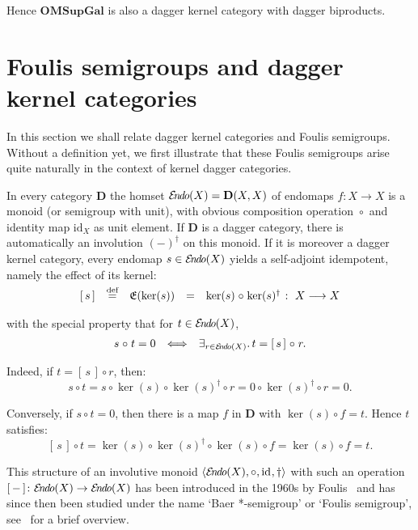\documentclass{article}
\newcommand{\after}{\mathrel{\circ}}
\newcommand{\Cat}[1]{\ensuremath{\mathbf{#1}}}
\newcommand{\idmap}[1][]{\ensuremath{\mathrm{id}_{#1}}}
\newcommand{\exin}[3]{\exists_{#1\in#2}.\,#3}
\newcommand{\effect}[1]{\mathfrak{E}(#1)}
\newcommand{\sai}[1]{[\,#1\,]}
\newcommand{\EndoHom}[1]{{\cal E}{\kern-.5ex}\textit{n}{\kern-.2ex}\textit{d}{\kern-.2ex}\textit{o}(#1)}
\begin{document}
\noindent Hence \Cat{OMSupGal} is also a dagger kernel category
with dagger biproducts.





\section{Foulis semigroups and dagger kernel categories}\label{FoulisDagKerSec}

In this section we shall relate dagger kernel categories and Foulis
semigroups. Without a definition yet, we first illustrate that these
Foulis semigroups arise quite naturally in the context of kernel
dagger categories.

In every category \Cat{D} the homset $\EndoHom{X} = \Cat{D}(X, X)$ of
endomaps $f\colon X\rightarrow X$ is a monoid (or semigroup with
unit), with obvious composition operation $\after$ and identity map
$\idmap[X]$ as unit element. If \Cat{D} is a dagger category, there is
automatically an involution $(-)^\dag$ on this monoid. If it is
moreover a dagger kernel category, every endomap $s\in\EndoHom{X}$
yields a self-adjoint idempotent, namely the effect of its kernel:
\begin{equation}
\label{DagKerSaiEqn}
\begin{array}{rcccl}
\sai{s}
& \smash{\stackrel{\textrm{def}}{=}} &
\effect{\ker(s)}
& = &
\ker(s) \after \ker(s)^{\dag} \;\colon\; X\longrightarrow X
\end{array}
\end{equation}

\noindent with the special property that for $t\in\EndoHom{X}$,
$$\begin{array}{rcl}
s\after t = 0
& \Longleftrightarrow &
\exin{r}{\EndoHom{X}}{t = \sai{s} \after r}.
\end{array}$$

\noindent Indeed, if $t=\sai{s}\after r$, then:
$$s \after t
=
s \after \ker(s) \after \ker(s)^{\dag} \after r
=
0 \after \ker(s)^{\dag} \after r 
=
0.$$

\noindent Conversely, if $s\after t = 0$, then there is a map
$f$ in \Cat{D} with $\ker(s) \after f = t$. Hence $t$ satisfies:
$$\sai{s} \after t
=
\ker(s) \after \ker(s)^{\dag} \after \ker(s) \after f
=
\ker(s) \after f
=
t.$$

This structure of an involutive monoid $\langle\EndoHom{X}, \after,
\idmap, \dag\rangle$ with such an operation $\sai{-}\colon \EndoHom{X}
\rightarrow \EndoHom{X}$ has been introduced in the 1960s by
Foulis~\cite{Foulis60,Foulis62,Foulis63} and has since then been
studied under the name `Baer *-semigroup' or `Foulis semigroup',
see~\cite[Chapter~5, \S\S18]{Kalmbach83} for a brief overview.
\end{document}
